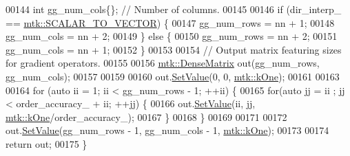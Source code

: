 \begin{DoxyCode}
00144   \textcolor{keywordtype}{int} gg\_num\_cols\{\};  \textcolor{comment}{// Number of columns.}
00145 
00146   \textcolor{keywordflow}{if} (dir\_interp\_ == \hyperlink{namespacemtk_ga674ec67bd1baa04e5dc06c2bcc351972abc9e2b8cd5a497c9f3252a792e356139}{mtk::SCALAR\_TO\_VECTOR}) \{
00147     gg\_num\_rows = nn + 1;
00148     gg\_num\_cols = nn + 2;
00149   \} \textcolor{keywordflow}{else} \{
00150     gg\_num\_rows = nn + 2;
00151     gg\_num\_cols = nn + 1;
00152   \}
00153 
00154   \textcolor{comment}{// Output matrix featuring sizes for gradient operators.}
00155 
00156   \hyperlink{classmtk_1_1DenseMatrix}{mtk::DenseMatrix} out(gg\_num\_rows, gg\_num\_cols);
00157 
00159 
00160   out.\hyperlink{classmtk_1_1DenseMatrix_ae0f873a6d3a734da467cafb817da64ae}{SetValue}(0, 0, \hyperlink{group__c01-roots_ga26407c24d43b6b95480943340d285c71}{mtk::kOne});
00161 
00163 
00164   \textcolor{keywordflow}{for} (\textcolor{keyword}{auto} ii = 1; ii < gg\_num\_rows - 1; ++ii) \{
00165     \textcolor{keywordflow}{for}(\textcolor{keyword}{auto} jj = ii ; jj < order\_accuracy\_ + ii; ++jj) \{
00166       out.\hyperlink{classmtk_1_1DenseMatrix_ae0f873a6d3a734da467cafb817da64ae}{SetValue}(ii, jj, \hyperlink{group__c01-roots_ga26407c24d43b6b95480943340d285c71}{mtk::kOne}/order\_accuracy\_);
00167     \}
00168   \}
00169 
00171 
00172   out.\hyperlink{classmtk_1_1DenseMatrix_ae0f873a6d3a734da467cafb817da64ae}{SetValue}(gg\_num\_rows - 1, gg\_num\_cols - 1, \hyperlink{group__c01-roots_ga26407c24d43b6b95480943340d285c71}{mtk::kOne});
00173 
00174   \textcolor{keywordflow}{return} out;
00175 \}
\end{DoxyCode}
